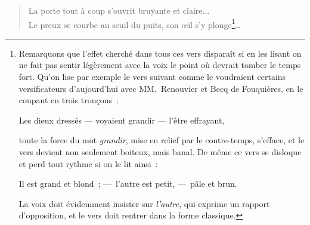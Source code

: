 \documentclass[french,twoside]{book} %
\begin{document}
\begin{verse}
La porte tout à coup s’ouvrit bruyante et claire...\\
Le preux se courbe au seuil du puits, son œil s’y plonge\footnote{\noindent Remarquons que l’effet cherché dans tous ces vers disparaît si en les lisant on ne fait pas sentir légèrement avec la voix le point où devrait tomber le temps fort. Qu’on lise par exemple le vers suivant comme le voudraient certains versificateurs d’aujourd’hui avec MM. Renouvier et Becq de Fouquières, en le coupant en trois tronçons :\par
Les dieux dressés — voyaient grandir — l’être effrayant,\\
\par
\noindent toute la force du mot \emph{grandir}, mise en relief par le contre-temps, s’efface, et le vers devient non seulement boiteux, mais banal. De même ce vers se disloque et perd tout rythme si on le lit ainsi :\par
Il est grand et blond ; — l’autre est petit, — pâle et brun.\\
\par
\noindent La voix doit évidemment insister sur \emph{l’autre}, qui exprime un rapport d’opposition, et le vers doit rentrer dans la forme classique.
}…\\
\end{verse}
\end{document}
